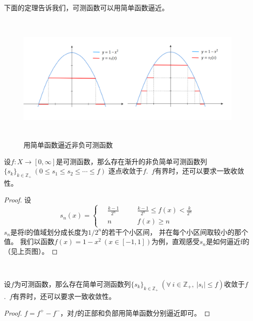 \documentclass[color=green,thmcnt=section,lang=cn,12pt]{elegantbook}
\numberwithin{equation}{section}%
\numberwithin{figure}{section}%
\newcommand{\ZZ}{\mathbb{Z}}
\newcommand{\any}{\forall \ }
\newcommand{\csf}[1]{\{#1_k\}_{k\in \ZZ_+}} %
\begin{document}
下面的定理告诉我们，可测函数可以用简单函数逼近。
\begin{figure}[!h]
    \centering
    \includegraphics[height=6.4cm]{image/2.png}
    \caption{用简单函数逼近非负可测函数}
\end{figure}
\begin{theorem}\label{feifukecehanshukeyoujiandanhanshubijin}
    设$f:X\to [0,\infty]$是可测函数，那么存在渐升的非负简单可测函数列$\csf{s}\ (0\leq s_1\leq s_2\leq \cdots \leq f) $
    逐点收敛于$f$.\ $f$有界时，还可以要求一致收敛性。
\end{theorem}
\begin{proof}
        设$$s_n(x)=\left\{
            \begin{aligned}
                &\ \frac{k-1}{2^n}& \quad &\frac{k-1}{2^n}\leq f(x)<\frac{k}{2^n}\\
                &\ n &\quad &f(x)\geq n
            \end{aligned}
            \right.
            $$
        $s_n$是将f的值域划分成长度为$1/2^n$的若干个小区间，
        并在每个小区间取较小的那个值。 我们以函数$f(x)=1-x^2\ (x\in[-1,1])$为例，直观感受$s_n$是如何逼近f的（见上页图）。
\end{proof}
\ 


\begin{corollary}\label{jiandanhanshuyizhishoulianyukecehanshu}
    设$f$为可测函数，那么存在简单可测函数列$\csf{s}\ (\any i\in \ZZ_+,\ |s_i| \leq f) $收敛于$f$.\ $f$有界时，还可以要求一致收敛性。
\end{corollary}
\begin{proof}
    $f=f^+-f^-$，对$f$的正部和负部用简单函数分别逼近即可。
\end{proof}
\ 
\end{document}
